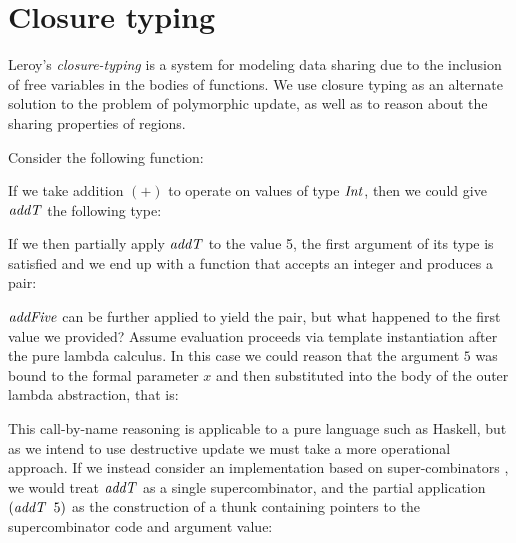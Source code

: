 \clearpage{}
\section{Closure typing}
\label{System:Closure}

Leroy's \emph{closure-typing} \cite{leroy:polymorphic-type-inference, leroy:polymorphic-typing} is a system for modeling data sharing due to the inclusion of free variables in the bodies of functions. 
We use closure typing as an alternate solution to the problem of polymorphic update, as well as to reason about the sharing properties of regions. 

Consider the following function:


If we take addition $(+)$ to operate on values of type $\operatorname{\mathit{Int}}$, then we could give $\operatorname{\mathit{addT}}$ the following type:

\code{
	$\iaddT :: \iInt \to \iInt \to \iPair \ \iInt \ \iInt$
}

If we then partially apply $\operatorname{\mathit{addT}}$ to the value 5, the first argument of its type is satisfied and we end up with a function that accepts an integer and produces a pair:


$\operatorname{\mathit{addFive}}$ can be further applied to yield the pair, but what happened to the first value we provided? Assume  evaluation proceeds via template instantiation after the pure lambda calculus. In this case we could reason that the argument $5$ was bound to the formal parameter $x$ and then substituted into the body of the outer lambda abstraction, that is:


This call-by-name reasoning is applicable to a pure language such as Haskell, but as we intend to use
destructive update we must take a more operational approach. If we instead consider an implementation based on super-combinators \cite{hughes:thesis}, we would treat $\operatorname{\mathit{addT}}$ as a single supercombinator, and the partial application $(\operatorname{\mathit{addT}} \ 5)$ as the construction of a thunk containing pointers to the supercombinator code and argument value:


